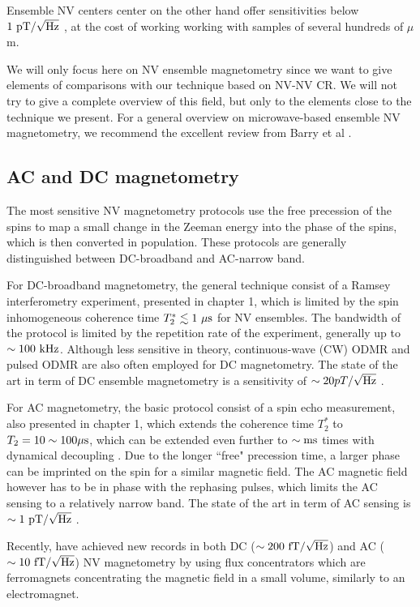 \documentclass[a4paper,11pt]{report}
\begin{document}
Ensemble NV centers center on the other hand offer sensitivities below $1\ \rm pT / \sqrt{\rm Hz}$ \citep{wolf2015subpicotesla}, at the cost of working working with samples of several hundreds of $\mu$m.

We will only focus here on NV ensemble magnetometry since we want to give elements of comparisons with our technique based on NV-NV CR. We will not try to give a complete overview of this field, but only to the elements close to the technique we present. For a general overview on microwave-based ensemble NV magnetometry, we recommend the excellent review from Barry et al \citep{barry2020sensitivity}.

\subsection{AC and DC magnetometry}
The most sensitive NV magnetometry protocols use the free precession of the spins to map a small change in the Zeeman energy into the phase of the spins, which is then converted in population. These protocols are generally distinguished between DC-broadband and AC-narrow band.

For DC-broadband magnetometry, the general technique consist of a Ramsey interferometry experiment, presented in chapter 1, which is limited by the spin inhomogeneous coherence time $T_2^* \lesssim 1\ \rm{\mu s}$ for NV ensembles. The bandwidth of the protocol is limited by the repetition rate of the experiment, generally up to $\sim 100\ \rm kHz$. Although less sensitive in theory, continuous-wave (CW) ODMR and pulsed ODMR are also often employed for DC magnetometry. The state of the art in term of DC ensemble magnetometry is a sensitivity of $\sim 20 pT/ \sqrt{\rm Hz}$ \citep{barry2016optical, chatzidrosos2017miniature}.

For AC magnetometry, the basic protocol consist of a spin echo measurement, also presented in chapter 1, which extends the coherence time $T_2^*$ to $T_2 = 10 \sim 100 \rm{\mu s}$, which can be extended even further to $\sim \rm ms$ times with dynamical decoupling \citep{pham2012enhanced}. Due to the longer ``free" precession time, a larger phase can be imprinted on the spin for a similar magnetic field. The AC magnetic field however has to be in phase with the rephasing pulses, which limits the AC sensing to a relatively narrow band. The state of the art in term of AC sensing is $\sim 1\ \rm pT/\sqrt{\rm Hz}$ \citep{wolf2015subpicotesla}.

Recently, \citep{xie2021hybrid} have achieved new records in both DC ($\sim 200\ \rm fT/\sqrt{\rm Hz}$) and AC ($\sim 10\ \rm fT/\sqrt{\rm Hz}$) NV magnetometry by using flux concentrators which are ferromagnets concentrating the magnetic field in a small volume, similarly to an electromagnet.
\end{document}
